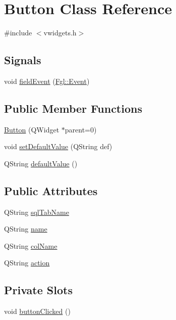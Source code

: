 \hypertarget{classButton}{
\section{Button Class Reference}
\label{classButton}
}


{\ttfamily \#include $<$vwidgets.h$>$}

\subsection*{Signals}
\begin{DoxyCompactItemize}
\item 
void \hyperlink{classButton_afb9d23602c59179d9e541d95a52e1612}{fieldEvent} (\hyperlink{structFgl_1_1Event}{Fgl::Event})
\end{DoxyCompactItemize}
\subsection*{Public Member Functions}
\begin{DoxyCompactItemize}
\item 
\hyperlink{classButton_a87565544cd9fbee675f6b6d61a319efd}{Button} (QWidget $\ast$parent=0)
\item 
void \hyperlink{classButton_a85603673dc21f0703ecf65b57074c6c1}{setDefaultValue} (QString def)
\item 
QString \hyperlink{classButton_a68c8479e83a9aa76cf971a4354dd8620}{defaultValue} ()
\end{DoxyCompactItemize}
\subsection*{Public Attributes}
\begin{DoxyCompactItemize}
\item 
QString \hyperlink{classButton_a3c40dd889e54499440ca3e90a392fe36}{sqlTabName}
\item 
QString \hyperlink{classButton_ac1343196c45cdd97326986d07f4f92e6}{name}
\item 
QString \hyperlink{classButton_abfcc86863175ffc43eb959f709a24d54}{colName}
\item 
QString \hyperlink{classButton_a3d472186a4f3eea8b25c602f1d4df9f5}{action}
\end{DoxyCompactItemize}
\subsection*{Private Slots}
\begin{DoxyCompactItemize}
\item 
void \hyperlink{classButton_a1f80f1cffe05015e5406da5a473ef789}{buttonClicked} ()
\end{DoxyCompactItemize}
